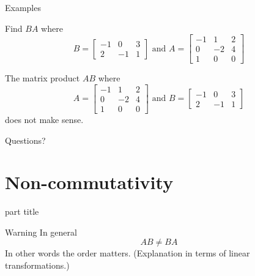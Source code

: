 \documentclass{beamer}
\begin{document}
\begin{frame}{Examples}
  \begin{example}
    Find $BA$ where
    \begin{equation*}
      B = \left[
        \begin{array}{ccc}
          -1 &0 & 3\\
          2 & -1 & 1
        \end{array}\right]
      \text{ and } A = \left[
        \begin{array}{ccc}
          -1 &1 & 2\\
          0 & -2 & 4\\
          1 & 0 & 0
        \end{array}\right]
    \end{equation*}
  \end{example}
  \begin{example}
    The matrix product $AB$ where
    \begin{equation*}
      A = \left[
        \begin{array}{ccc}
          -1 &1 & 2\\
          0 & -2 & 4\\
          1 & 0 & 0
        \end{array}\right]
      \text{ and }B = \left[
        \begin{array}{ccc}
          -1 &0 & 3\\
          2 & -1 & 1
        \end{array}\right]
    \end{equation*}
    does not make sense.
  \end{example}
\end{frame}

\begin{frame}
  Questions?
\end{frame}

\section{Non-commutativity}

\begin{frame}
  \begin{beamercolorbox}[sep=12pt,center]{part title}
    \insertsection\par
  \end{beamercolorbox}
\end{frame}

\begin{frame}{Warning}
  In general
  \begin{equation*}
    AB \neq BA
  \end{equation*}\vfill
  In other words the order matters.\vfill
  (Explanation in terms of linear transformations.)
\end{frame}
\end{document}
